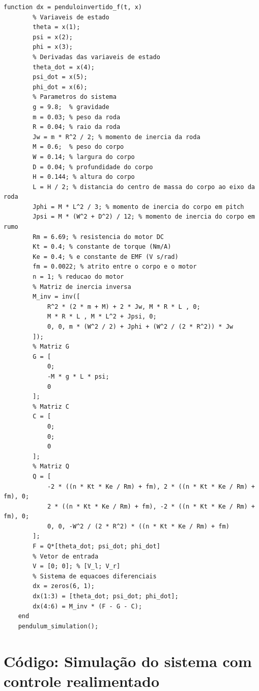 \documentclass[10pt]{article}
\begin{document}
\begin{appendices}
\begin{lstlisting}[caption={Código da simulação do sistema com ode45}, label=lst:pendulum_sim_l]
    function dx = penduloinvertido_f(t, x)
        % Variaveis de estado
        theta = x(1);
        psi = x(2);
        phi = x(3);
        % Derivadas das variaveis de estado
        theta_dot = x(4);
        psi_dot = x(5);
        phi_dot = x(6);
        % Parametros do sistema
        g = 9.8;  % gravidade
        m = 0.03; % peso da roda
        R = 0.04; % raio da roda
        Jw = m * R^2 / 2; % momento de inercia da roda
        M = 0.6;  % peso do corpo
        W = 0.14; % largura do corpo
        D = 0.04; % profundidade do corpo
        H = 0.144; % altura do corpo
        L = H / 2; % distancia do centro de massa do corpo ao eixo da roda
        Jphi = M * L^2 / 3; % momento de inercia do corpo em pitch
        Jpsi = M * (W^2 + D^2) / 12; % momento de inercia do corpo em rumo
        Rm = 6.69; % resistencia do motor DC
        Kt = 0.4; % constante de torque (Nm/A)
        Ke = 0.4; % e constante de EMF (V s/rad)
        fm = 0.0022; % atrito entre o corpo e o motor
        n = 1; % reducao do motor
        % Matriz de inercia inversa
        M_inv = inv([
            R^2 * (2 * m + M) + 2 * Jw, M * R * L , 0;
            M * R * L , M * L^2 + Jpsi, 0;
            0, 0, m * (W^2 / 2) + Jphi + (W^2 / (2 * R^2)) * Jw
        ]);
        % Matriz G
        G = [
            0;
            -M * g * L * psi;
            0
        ];
        % Matriz C
        C = [
            0;
            0;
            0
        ];
        % Matriz Q
        Q = [
            -2 * ((n * Kt * Ke / Rm) + fm), 2 * ((n * Kt * Ke / Rm) + fm), 0;
            2 * ((n * Kt * Ke / Rm) + fm), -2 * ((n * Kt * Ke / Rm) + fm), 0;
            0, 0, -W^2 / (2 * R^2) * ((n * Kt * Ke / Rm) + fm)
        ];
        F = Q*[theta_dot; psi_dot; phi_dot]
        % Vetor de entrada
        V = [0; 0]; % [V_l; V_r]
        % Sistema de equacoes diferenciais
        dx = zeros(6, 1);
        dx(1:3) = [theta_dot; psi_dot; phi_dot];
        dx(4:6) = M_inv * (F - G - C);
    end
    pendulum_simulation();
\end{lstlisting}

\section{Código: Simulação do sistema com controle realimentado}


\end{appendices}
\end{document}
